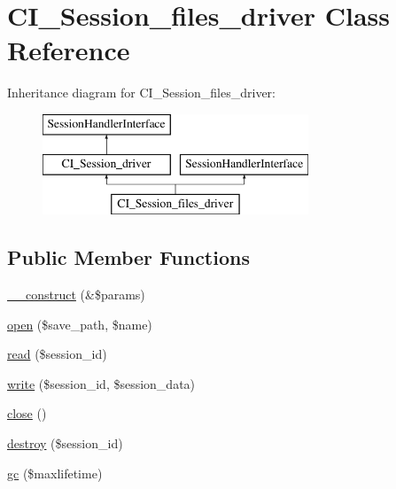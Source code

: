 \hypertarget{class_c_i___session__files__driver}{}\section{C\+I\+\_\+\+Session\+\_\+files\+\_\+driver Class Reference}
\label{class_c_i___session__files__driver}
Inheritance diagram for C\+I\+\_\+\+Session\+\_\+files\+\_\+driver\+:\begin{figure}[H]
\begin{center}
\leavevmode
\includegraphics[height=3.000000cm]{class_c_i___session__files__driver}
\end{center}
\end{figure}
\subsection*{Public Member Functions}
\begin{DoxyCompactItemize}
\item 
\hyperlink{class_c_i___session__files__driver_ac1669c73d53d6f16cf5459a1e84d39c8}{\+\_\+\+\_\+construct} (\&\$params)
\item 
\hyperlink{class_c_i___session__files__driver_a614b5cf3840833913c7a73260ed28e02}{open} (\$save\+\_\+path, \$name)
\item 
\hyperlink{class_c_i___session__files__driver_a5bbf84ebf657be4eaccc0582377c76bf}{read} (\$session\+\_\+id)
\item 
\hyperlink{class_c_i___session__files__driver_ad9d124885be93668f1dbf6aace5964f5}{write} (\$session\+\_\+id, \$session\+\_\+data)
\item 
\hyperlink{class_c_i___session__files__driver_aa69c8bf1f1dcf4e72552efff1fe3e87e}{close} ()
\item 
\hyperlink{class_c_i___session__files__driver_aaec5812f6b4eb6835f88d3baa06a002a}{destroy} (\$session\+\_\+id)
\item 
\hyperlink{class_c_i___session__files__driver_a57aff7ee0656d8aa75d545fb8b3ae35d}{gc} (\$maxlifetime)
\end{DoxyCompactItemize}
